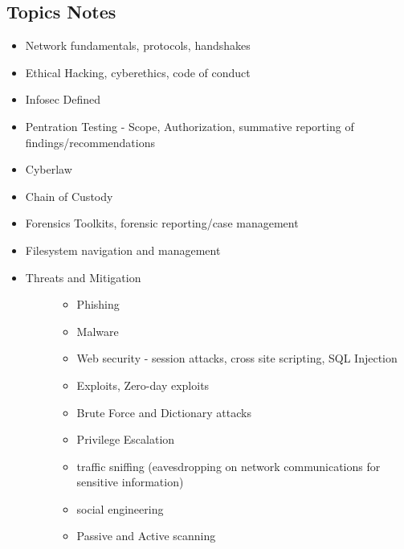 \documentclass[letterpaper,10pt,english]{sphinxmanual}
\begin{document}
\subsection{Topics Notes}
\label{cybersecurity:topics-notes}\begin{itemize}
\item {} 
Network fundamentals, protocols, handshakes

\item {} 
Ethical Hacking, cyberethics, code of conduct

\item {} 
Infosec Defined

\item {} 
Pentration Testing - Scope, Authorization, summative reporting of findings/recommendations

\item {} 
Cyberlaw

\item {} 
Chain of Custody

\item {} 
Forensics Toolkits, forensic reporting/case management

\item {} 
Filesystem navigation and management

\item {} \begin{description}
\item[{Threats and Mitigation}] \leavevmode\begin{itemize}
\item {} 
Phishing

\item {} 
Malware

\item {} 
Web security - session attacks, cross site scripting, SQL Injection

\item {} 
Exploits, Zero-day exploits

\item {} 
Brute Force and Dictionary attacks

\item {} 
Privilege Escalation

\item {} 
traffic sniffing (eavesdropping on network communications for sensitive information)

\item {} 
social engineering

\item {} 
Passive and Active scanning


\end{itemize}
\end{description}
\end{itemize}
\end{document}
